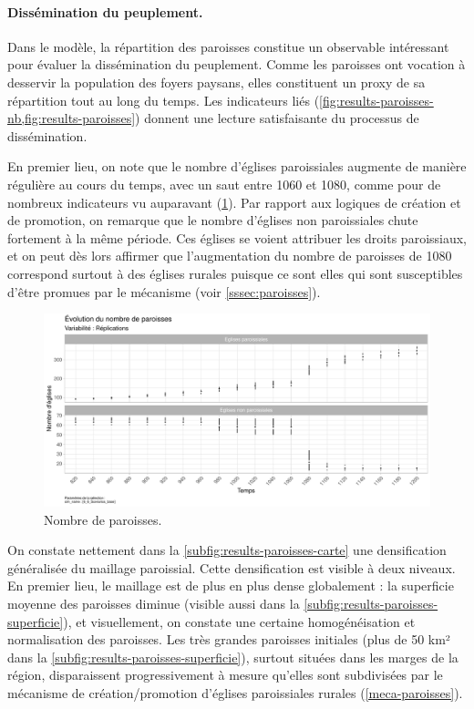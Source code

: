 \paragraph{Dissémination du peuplement.}

Dans le modèle, la répartition des paroisses constitue un observable intéressant pour évaluer la dissémination du peuplement.
Comme les paroisses ont vocation à desservir la population des foyers paysans, elles constituent un proxy de sa répartition tout au long du temps.
Les indicateurs liés (\cref{fig:results-paroisses-nb,fig:results-paroisses}) donnent une lecture satisfaisante du processus de dissémination.

En premier lieu, on note que le nombre d'églises paroissiales augmente de manière régulière au cours du temps, avec un saut entre 1060 et 1080, comme pour de nombreux indicateurs vu auparavant (\cref{fig:results-paroisses-nb}).
Par rapport aux logiques de création et de promotion, on remarque que le nombre d'églises non paroissiales chute fortement à la même période.
Ces églises se voient attribuer les droits paroissiaux, et on peut dès lors affirmer que l'augmentation du nombre de paroisses de 1080 correspond surtout à des églises rurales puisque ce sont elles qui sont susceptibles d'être promues par le mécanisme (voir \cref{sssec:paroisses}).

\begin{figure}[H]
	\centering
	\includegraphics[width=\linewidth]{img/results_6_6/Paroisses_Nb_Haut.pdf}
	\caption{Nombre de paroisses.}
	\label{fig:results-paroisses-nb}
\end{figure}

On constate nettement dans la \cref{subfig:results-paroisses-carte} une densification généralisée du maillage paroissial.
Cette densification est visible à deux niveaux.
En premier lieu, le maillage est de plus en plus dense globalement : la superficie moyenne des paroisses diminue (visible aussi dans la \cref{subfig:results-paroisses-superficie}), et visuellement, on constate une certaine homogénéisation et normalisation des paroisses.
Les très grandes paroisses initiales (plus de 50 km² dans la \cref{subfig:results-paroisses-superficie}), surtout situées dans les marges de la région, disparaissent progressivement à mesure qu'elles sont subdivisées par le mécanisme de création/promotion d'églises paroissiales rurales (\cref{meca-paroisses}).

